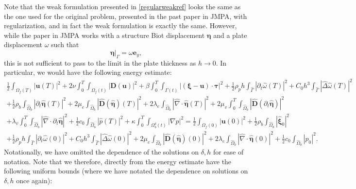 \documentclass[11pt]{article}
\newcommand{\bd}{\boldsymbol}
\theoremstyle{definition}
\begin{document}
Note that the weak formulation presented in \eqref{regularweakref} looks the same as the one used for the original problem, presented in the past paper in JMPA, with regularization, and in fact the weak formulation is exactly the same. However, while the paper in JMPA works with a structure Biot displacement $\bd{\eta}$ and a plate displacement $\omega$ such that
\begin{equation*}
\bd{\eta}|_{\Gamma} = \omega \bd{e}_{y},
\end{equation*}
this is not sufficient to pass to the limit in the plate thickness as $h \to 0$. In particular, we would have the following energy estimate:
\begin{multline}\label{energy}
\frac{1}{2} \int_{\Omega_{f}(T)} |\boldsymbol{u}(T)|^{2} + 2\nu \int_{0}^{T} \int_{\Omega_{f}(t)} |\boldsymbol{D}(\boldsymbol{u})|^{2} + \beta \int_{0}^{T} \int_{\Gamma(t)} |(\boldsymbol{\xi} - \boldsymbol{u}) \cdot \boldsymbol{\tau}|^{2} + \frac{1}{2}\rho_{p} h \int_{\hat{\Gamma}} |\partial_{t} \hat{\omega}(T)|^{2} + C_{0}h^{3} \int_{\hat{\Gamma}} |\hat{\Delta} \hat{\omega}(T)|^{2} \\
+ \frac{1}{2} \rho_{b} \int_{\hat{\Omega}_{b}} |\partial_{t}\hat{\boldsymbol{\eta}}(T)|^{2} + 2\mu_{e} \int_{\hat{\Omega}_{b}} |\hat{\bd{D}}(\hat{\bd{\eta}})(T)|^{2} + 2\lambda_{e} \int_{\hat{\Omega}_{b}} |\hat{\nabla} \cdot \hat{\bd{\eta}}(T)|^{2} + 2\mu_{v} \int_{0}^{T} \int_{\hat{\Omega}_{b}} |\hat{\boldsymbol{D}}(\partial_{t} \hat{\bd{\eta}})|^{2} \\
+ \lambda_{v} \int_{0}^{T} \int_{\hat{\Omega}_{b}} |\hat{\nabla} \cdot \partial_{t}\hat{\boldsymbol{\eta}}|^{2}
+ \frac{1}{2} c_{0} \int_{\hat{\Omega}_{b}} |\hat{p}(T)|^{2} + \kappa \int_{0}^{T} \int_{\Omega_{b}^{\delta}(t)} |\nabla p|^{2} = \frac{1}{2} \int_{\Omega_{f}(0)} |\boldsymbol{u}(0)|^{2} + \frac{1}{2} \rho_{b} \int_{\hat{\Omega}_{b}} |\hat{\bd{\xi}}_{0}|^{2} \\
+ \frac{1}{2} \rho_{p} h \int_{\hat{\Gamma}} |\partial_{t} \hat{\omega}(0)|^{2} + C_{0}h^{3} \int_{\hat{\Gamma}} |\hat{\Delta} \hat{\omega}(0)|^{2} + 2\mu_{e} \int_{\hat{\Omega}_{b}} |\hat{\bd{D}}(\hat{\bd{\eta}})(0)|^{2} + 2\lambda_{e} \int_{\hat{\Omega}_{b}} |\hat{\nabla} \cdot \hat{\bd{\eta}}(0)|^{2} + \frac{1}{2} c_{0} \int_{\hat{\Omega}_{b}} |\hat{p}_0|^{2}.
\end{multline}
Notationally, we have omitted the dependence of the solutions on $\delta, h$ for ease of notation. Note that we therefore, directly from the energy estimate have the following uniform bounds (where we have notated the dependence on solutions on $\delta, h$ once again):
\end{document}
